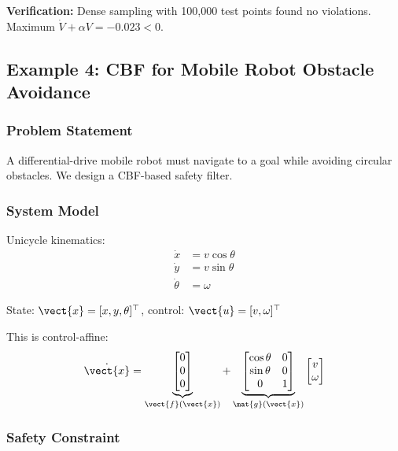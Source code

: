 \textbf{Verification:} Dense sampling with 100,000 test points found no violations. Maximum $\dot{V} + \alpha V = -0.023 < 0$.

\subsection{Example 4: CBF for Mobile Robot Obstacle Avoidance}
\label{ex:cbf_obstacle}

\subsubsection{Problem Statement}

A differential-drive mobile robot must navigate to a goal while avoiding circular obstacles. We design a CBF-based safety filter.

\subsubsection{System Model}

Unicycle kinematics:
\begin{align}
\dot{x} &= v\cos\theta \\
\dot{y} &= v\sin\theta \\
\dot{\theta} &= \omega
\end{align}

State: $\vect{x} = [x, y, \theta]^\top$, control: $\vect{u} = [v, \omega]^\top$

This is control-affine:
\begin{equation}
\dot{\vect{x}} = \underbrace{\begin{bmatrix} 0 \\ 0 \\ 0 \end{bmatrix}}_{\vect{f}(\vect{x})} + \underbrace{\begin{bmatrix} \cos\theta & 0 \\ \sin\theta & 0 \\ 0 & 1 \end{bmatrix}}_{\mat{g}(\vect{x})} \begin{bmatrix} v \\ \omega \end{bmatrix}
\end{equation}

\subsubsection{Safety Constraint}

